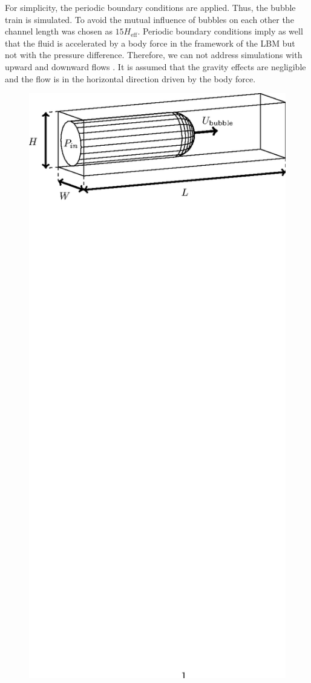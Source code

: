 \documentclass{article}
\begin{document}
For simplicity, the periodic boundary conditions are applied. Thus, the bubble train is simulated.
To avoid the mutual influence of bubbles on each other the channel length was chosen as $15
H_{\mathrm{eff}}$. Periodic boundary conditions imply as well that the fluid is accelerated by a
body force in the framework of the LBM but not with the pressure difference. Therefore, we can not
address simulations with upward and downward flows \cite{cerro-bubble-train}. It is assumed that
the gravity effects are negligible and the flow is in the horizontal direction driven by the body
force. 
\begin{figure}[ht]
\includegraphics*[bb=153 610 405 717,width=\textwidth]{Figures/benchmark_classical.eps} 

\end{figure}
\end{document}
